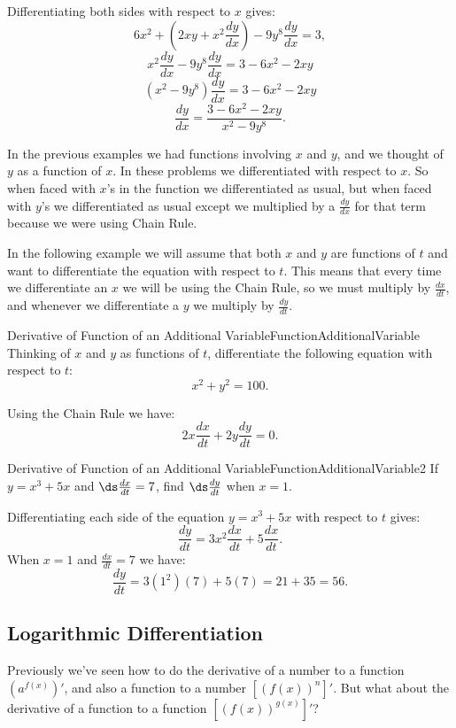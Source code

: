 \begin{solution} 
Differentiating both sides with respect to $x$ gives:
$$6x^2+\left(2xy+x^2\frac{dy}{dx}\right)-9y^8\frac{dy}{dx}=3,$$
$$x^2\frac{dy}{dx}-9y^8\frac{dy}{dx}=3-6x^2-2xy$$
$$\left(x^2-9y^8\right)\frac{dy}{dx}=3-6x^2-2xy$$
$$\frac{dy}{dx}=\frac{3-6x^2-2xy}{x^2-9y^8}.$$
\end{solution}

In the previous examples we had functions involving $x$ and $y$, and we
thought of $y$ as a function of $x$.  In these problems we
differentiated with respect to $x$. So when faced with $x$'s in the
function we differentiated as usual, but when faced with $y$'s we
differentiated as usual except we multiplied by a $\frac{dy}{dx}$ for
that term because we were using Chain Rule.

In the following example we will assume that both $x$ and $y$ are
functions of $t$ and want to differentiate the equation with respect
to $t$.  This means that every time we differentiate an $x$ we will be
using the Chain Rule, so we must multiply by $\frac{dx}{dt}$, and
whenever we differentiate a $y$ we multiply by $\frac{dy}{dt}$.

\begin{example}{Derivative of Function of an Additional Variable}{FunctionAdditionalVariable}
Thinking of $x$ and $y$ as functions of $t$, differentiate the following equation with respect to $t$:
$$x^2+y^2=100.$$
\vspace{-0.5cm}
\end{example}

\begin{solution} 
Using the Chain Rule we have:
$$2x\frac{dx}{dt}+2y\frac{dy}{dt}=0.$$
\end{solution}

\begin{example}{Derivative of Function of an Additional Variable}{FunctionAdditionalVariable2}
If $y=x^3+5x$ and $\ds\frac{dx}{dt}=7$, find $\ds\frac{dy}{dt}$ when $x=1$.
\end{example}

\begin{solution} 
Differentiating each side of the equation $y=x^3+5x$ with respect to $t$ gives:
$$\frac{dy}{dt}=3x^2\frac{dx}{dt}+5\frac{dx}{dt}.$$
When $x=1$ and $\frac{dx}{dt}=7$ we have:
$$\frac{dy}{dt}=3(1^2)(7)+5(7)=21+35=56.$$
\end{solution}

\subsection*{Logarithmic Differentiation}
Previously we've seen how to do the derivative of a number to a function $(a^{f(x)})'$, and also a function to a number $[(f(x))^n]'$.
But what about the derivative of a function to a function $[(f(x))^{g(x)}]'$?

